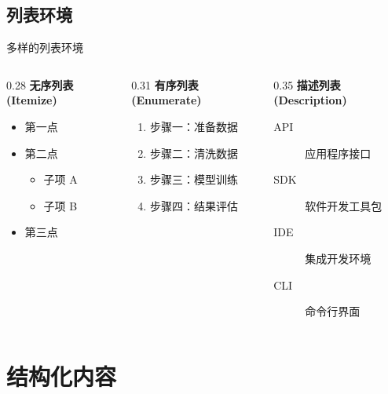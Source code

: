 \subsection{列表环境}
\begin{frame}{多样的列表环境}
  \begin{columns}[T]
    \begin{column}{0.28\textwidth}
      \textbf{\color{main} 无序列表 (Itemize)}
      \begin{itemize}
        \item 第一点
        \item 第二点
          \begin{itemize}
            \item 子项 A
            \item 子项 B
          \end{itemize}
        \item 第三点
      \end{itemize}
    \end{column}
    \begin{column}{0.31\textwidth}
      \textbf{\color{main} 有序列表 (Enumerate)}
      \begin{enumerate}
        \item 步骤一：准备数据
        \item 步骤二：清洗数据
        \item 步骤三：模型训练
        \item 步骤四：结果评估
      \end{enumerate}
    \end{column}
    \begin{column}{0.35\textwidth}
      \textbf{\color{main} 描述列表 (Description)}
      \begin{description}
        \item[API] 应用程序接口
        \item[SDK] 软件开发工具包
        \item[IDE] 集成开发环境
        \item[CLI] 命令行界面
      \end{description}
    \end{column}
  \end{columns}
\end{frame}

\section{结构化内容}

